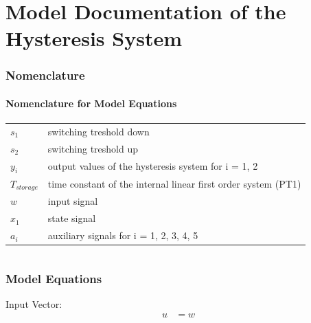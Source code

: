 \documentclass[10pt,a4paper]{article}
\begin{document}
	\part*{Model Documentation of the \\ Hysteresis System} %


	\section{Nomenclature} %
	\subsection{Nomenclature for Model Equations} %

	\begin{tabular}{ll}
		$s_1$ & switching treshold down \\
		$s_2$ & switching treshold up \\
		$y_i$ & output values of the hysteresis system for i = 1, 2 \\
		$T_{storage}$ & time constant of the internal linear first order system (PT1) \\
		$w$ & input signal \\
		$x_1$ & state signal\\
		$a_i$ & auxiliary signals for i = 1, 2, 3, 4, 5 \\
	\end{tabular}


	\begin{tabular}{ll}

	\end{tabular}


	\section{Model Equations} %

	Input Vector:
	\begin{align*}
		u &= w
	\end{align*}
\end{document}
